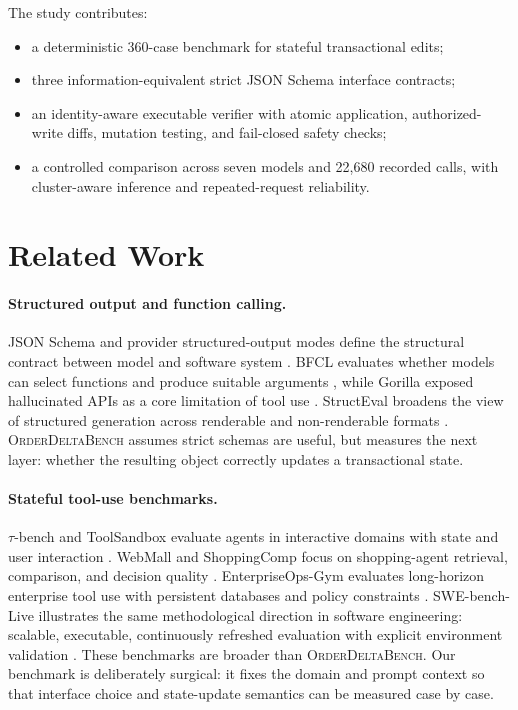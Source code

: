 \documentclass[11pt]{article}
\newcommand{\orderdelta}{\textsc{OrderDeltaBench}}
\begin{document}
The study contributes:
\begin{itemize}[leftmargin=*]
  \item a deterministic 360-case benchmark for stateful transactional edits;
  \item three information-equivalent strict JSON Schema interface contracts;
  \item an identity-aware executable verifier with atomic application,
  authorized-write diffs, mutation testing, and fail-closed safety checks;
  \item a controlled comparison across seven models and 22,680 recorded calls,
  with cluster-aware inference and repeated-request reliability.
\end{itemize}

\section{Related Work}
\paragraph{Structured output and function calling.}
JSON Schema and provider structured-output modes define the structural contract
between model and software system \cite{jsonschema2020,openai2024structured}.
BFCL evaluates whether models can select functions and produce suitable
arguments \cite{patil2025bfcl}, while Gorilla exposed hallucinated APIs as a
core limitation of tool use \cite{patil2023gorilla}. StructEval broadens the
view of structured generation across renderable and non-renderable formats
\cite{yang2025structeval}. \orderdelta{} assumes strict schemas are useful, but
measures the next layer: whether the resulting object correctly updates a
transactional state.

\paragraph{Stateful tool-use benchmarks.}
\(\tau\)-bench and ToolSandbox evaluate agents in interactive domains with
state and user interaction \cite{yao2024taubench,lu2024toolsandbox}. WebMall and
ShoppingComp focus on shopping-agent retrieval, comparison, and decision
quality \cite{webmall2026,tou2025shoppingcomp}. EnterpriseOps-Gym evaluates
long-horizon enterprise tool use with persistent databases and policy
constraints \cite{enterpriseopsgym2026}. SWE-bench-Live illustrates the same
methodological direction in software engineering: scalable, executable,
continuously refreshed evaluation with explicit environment validation
\cite{zhang2025swebenchlive}. These benchmarks are broader than
\orderdelta. Our benchmark is deliberately surgical: it fixes the domain and
prompt context so that interface choice and state-update semantics can be
measured case by case.
\end{document}
